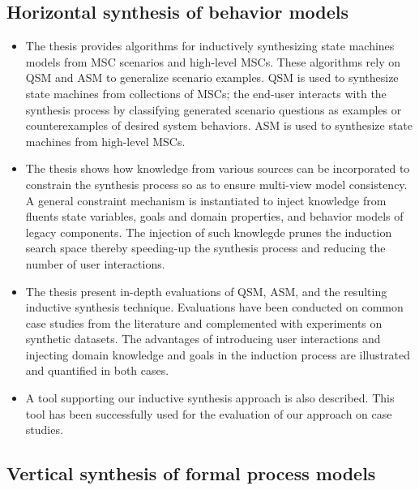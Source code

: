 
\subsection{Horizontal synthesis of behavior models\label{subsection:intro-contrib-inductive-synthesis}}
\begin{itemize}
\item The thesis provides algorithms for inductively synthesizing state machines models from MSC scenarios and high-level MSCs. These algorithms rely on QSM and ASM to generalize scenario examples. QSM is used to synthesize state machines from collections of MSCs; the end-user interacts with the synthesis process by classifying generated scenario questions as examples or counterexamples of desired system behaviors. ASM is used to synthesize state machines from high-level MSCs.
\item The thesis shows how knowledge from various sources can be incorporated to constrain the synthesis process so as to ensure multi-view model consistency. A general constraint mechanism is instantiated to inject knowledge from fluents state variables, goals and domain properties, and behavior models of legacy components. The injection of such knowlegde prunes the induction search space thereby speeding-up the synthesis process and reducing the number of user interactions.
\item The thesis present in-depth evaluations of QSM, ASM, and the resulting inductive synthesis technique. Evaluations have been conducted on common case studies from the literature and complemented with experiments on synthetic datasets. The advantages of introducing user interactions and injecting domain knowledge and goals in the induction process are illustrated and quantified in both cases.
\item A tool supporting our inductive synthesis approach is also described. This tool has been successfully used for the evaluation of our approach on case studies.
\end{itemize}


\subsection{Vertical synthesis of formal process models\label{subsection:intro-contib-supporting-process-models}}

